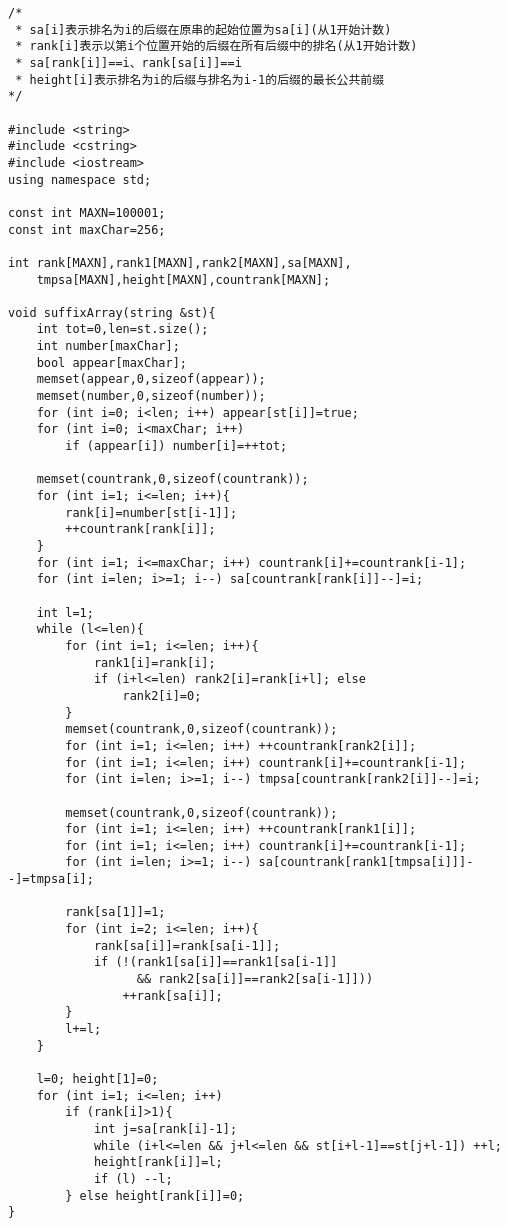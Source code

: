 \begin{verbatim}
/* 
 * sa[i]表示排名为i的后缀在原串的起始位置为sa[i](从1开始计数)
 * rank[i]表示以第i个位置开始的后缀在所有后缀中的排名(从1开始计数)
 * sa[rank[i]]==i、rank[sa[i]]==i
 * height[i]表示排名为i的后缀与排名为i-1的后缀的最长公共前缀
*/

#include <string>
#include <cstring>
#include <iostream>
using namespace std;

const int MAXN=100001;
const int maxChar=256;

int rank[MAXN],rank1[MAXN],rank2[MAXN],sa[MAXN],
    tmpsa[MAXN],height[MAXN],countrank[MAXN];

void suffixArray(string &st){
    int tot=0,len=st.size();
    int number[maxChar];
    bool appear[maxChar];
    memset(appear,0,sizeof(appear));
    memset(number,0,sizeof(number));
    for (int i=0; i<len; i++) appear[st[i]]=true;
    for (int i=0; i<maxChar; i++)
        if (appear[i]) number[i]=++tot;

    memset(countrank,0,sizeof(countrank));
    for (int i=1; i<=len; i++){
        rank[i]=number[st[i-1]];
        ++countrank[rank[i]];
    }
    for (int i=1; i<=maxChar; i++) countrank[i]+=countrank[i-1];
    for (int i=len; i>=1; i--) sa[countrank[rank[i]]--]=i;

    int l=1;
    while (l<=len){
        for (int i=1; i<=len; i++){
            rank1[i]=rank[i];
            if (i+l<=len) rank2[i]=rank[i+l]; else 
                rank2[i]=0;
        }
        memset(countrank,0,sizeof(countrank));
        for (int i=1; i<=len; i++) ++countrank[rank2[i]];
        for (int i=1; i<=len; i++) countrank[i]+=countrank[i-1];
        for (int i=len; i>=1; i--) tmpsa[countrank[rank2[i]]--]=i;

        memset(countrank,0,sizeof(countrank));
        for (int i=1; i<=len; i++) ++countrank[rank1[i]];
        for (int i=1; i<=len; i++) countrank[i]+=countrank[i-1];
        for (int i=len; i>=1; i--) sa[countrank[rank1[tmpsa[i]]]--]=tmpsa[i];

        rank[sa[1]]=1;
        for (int i=2; i<=len; i++){
            rank[sa[i]]=rank[sa[i-1]];
            if (!(rank1[sa[i]]==rank1[sa[i-1]] 
                  && rank2[sa[i]]==rank2[sa[i-1]]))
                ++rank[sa[i]];
        }
        l+=l;
    }

    l=0; height[1]=0;
    for (int i=1; i<=len; i++)
        if (rank[i]>1){
            int j=sa[rank[i]-1];
            while (i+l<=len && j+l<=len && st[i+l-1]==st[j+l-1]) ++l;
            height[rank[i]]=l;
            if (l) --l;
        } else height[rank[i]]=0;
}
\end{verbatim}
